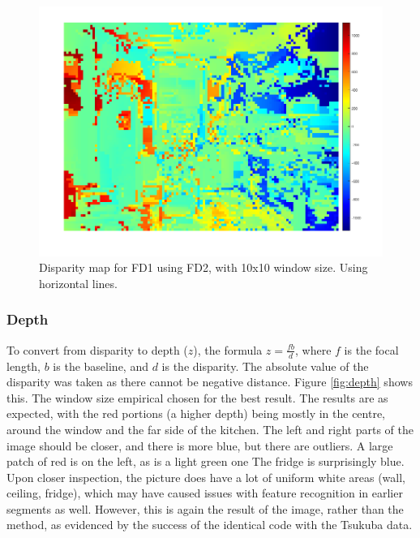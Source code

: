 \documentclass[a4paper, 10pt, conference]{ieeeconf}
\begin{document}
\begin{figure}[!ht]
  \centering
  \includegraphics[width=0.75\linewidth]{pic/q2_2_cd4_dis}
  \caption{Disparity map for FD1 using FD2, with 10x10 window size. Using horizontal lines.}
  \vspace{-0.25cm}
  \label{fig:depth10}
\end{figure}

\subsubsection{Depth}
To convert from disparity to depth ($z$), the formula $z = \frac{fb}{d}$, where $f$ is the focal length, $b$ is the baseline, and $d$ is the disparity. The absolute value of the disparity was taken as there cannot be negative distance. Figure \ref{fig:depth} shows this. The window size empirical chosen for the best result. The results are as expected, with the red portions (a higher depth) being mostly in the centre, around the window and the far side of the kitchen. The left and right parts of the image should be closer, and there is more blue, but there are outliers. A large patch of red is on the left, as is a light green one The fridge is surprisingly blue. Upon closer inspection, the picture does have a lot of uniform white areas (wall, ceiling, fridge), which may have caused issues with feature recognition in earlier segments as well. However, this is again the result of the image, rather than the method, as evidenced by the success of the identical code with the Tsukuba data.
\end{document}
